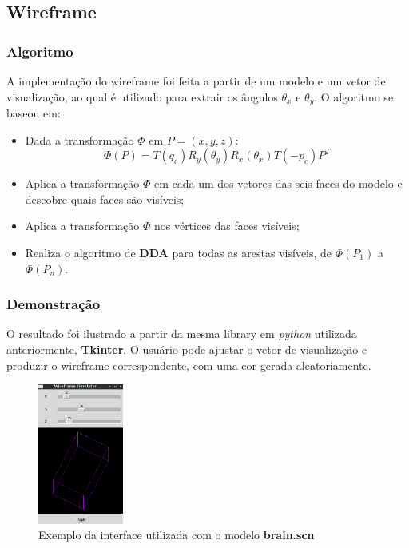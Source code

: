     \subsection{Wireframe}
        \subsubsection{Algoritmo}
            A implementação do wireframe foi feita a partir de um modelo e um vetor de visualização, ao qual é utilizado para extrair os ângulos $\theta_x$ e $\theta_y$. O algoritmo se baseou em:

            \begin{itemize}
                \item Dada a transformação \textbf{$\Phi$} em \textbf{$P = (x, y, z)$}: \\
                \begin{equation}
                \Phi(P) = T(q_c)R_y(\theta_y)R_x(\theta_x)T(-p_c)P^{T}
                \end{equation}
                \item Aplica a transformação \textbf{$\Phi$} em cada um dos vetores das seis faces do modelo e descobre quais faces são visíveis;
                \item Aplica a transformação \textbf{$\Phi$} nos vértices das faces visíveis;
                \item Realiza o algoritmo de \textbf{DDA} para todas as arestas visíveis, de $\Phi(P_1)$ a $\Phi(P_n)$.
            \end{itemize}

        \subsubsection{Demonstração}
            O resultado foi ilustrado a partir da mesma library em \textit{python} utilizada anteriormente, \textbf{Tkinter}. O usuário pode ajustar o vetor de visualização e produzir o wireframe correspondente, com uma cor gerada aleatoriamente.

            \begin{figure}[ht!]
                \centering
                \includegraphics[width=1.1in]{figures/wire_interface}
                \caption{Exemplo da interface utilizada com o modelo \textbf{brain.scn}}
            \end{figure}

